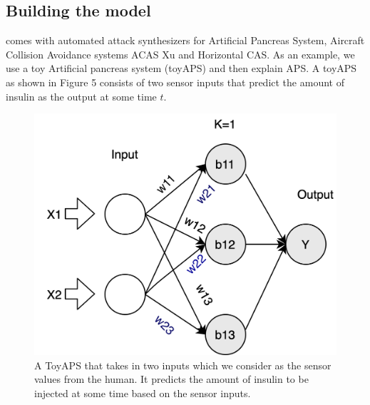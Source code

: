 \subsection{Building the model}
\label{section:attacks}
\tool comes with automated attack synthesizers for Artificial Pancreas System, Aircraft Collision Avoidance systems ACAS Xu and Horizontal CAS. %
As an example, we use a toy Artificial pancreas system (toyAPS) and then explain APS. A toyAPS as shown in Figure 5 consists of two sensor inputs that predict the amount of insulin as the output at some time $t$. 
\begin{figure}
	\centering
	\includegraphics[width=0.7\linewidth]{Images/ToyAPS}
	\caption[A ToyAPS]{A ToyAPS that takes in two inputs which we consider as the sensor values from the human. It predicts the amount of insulin to be injected at some time based on the sensor inputs.}
	\label{fig:toyaps}
\end{figure}


